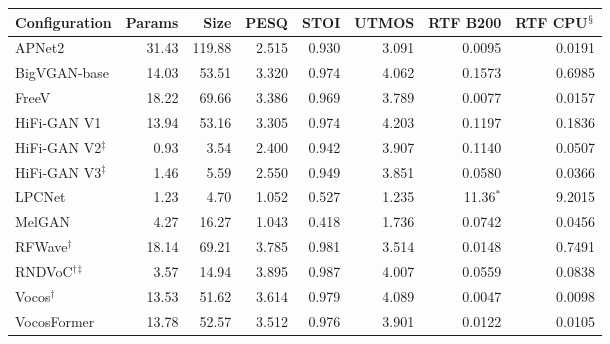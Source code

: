 \begin{tabular*}{\linewidth}{@{\extracolsep{\fill}}lrrrrrrr@{}}
  \toprule
  Configuration & Params & Size & PESQ & STOI & UTMOS & RTF B200 & RTF CPU$^{\mathsection}$ \\
  \midrule
  APNet2 & 31.43 & 119.88 & 2.515 & 0.930 & 3.091 & 0.0095 & 0.0191 \\
  BigVGAN-base & 14.03 & 53.51 & 3.320 & 0.974 & 4.062 & 0.1573 & 0.6985 \\
  FreeV & 18.22 & 69.66 & 3.386 & 0.969 & 3.789 & 0.0077 & 0.0157 \\
  HiFi-GAN V1 & 13.94 & 53.16 & 3.305 & 0.974 & 4.203 & 0.1197 & 0.1836 \\
  HiFi-GAN V2$^{\ddagger}$ & 0.93 & 3.54 & 2.400 & 0.942 & 3.907 & 0.1140 & 0.0507 \\
  HiFi-GAN V3$^{\ddagger}$ & 1.46 & 5.59 & 2.550 & 0.949 & 3.851 & 0.0580 & 0.0366 \\
  LPCNet & 1.23 & 4.70 & 1.052 & 0.527 & 1.235 & 11.36$^{*}$ & 9.2015 \\
  MelGAN & 4.27 & 16.27 & 1.043 & 0.418 & 1.736 & 0.0742 & 0.0456 \\
  RFWave$^{\dagger}$ & 18.14 & 69.21 & 3.785 & 0.981 & 3.514 & 0.0148 & 0.7491 \\
  RNDVoC$^{\dagger}$$^{\ddagger}$ & 3.57 & 14.94 & 3.895 & 0.987 & 4.007 & 0.0559 & 0.0838 \\
  Vocos$^{\dagger}$ & 13.53 & 51.62 & 3.614 & 0.979 & 4.089 & 0.0047 & 0.0098 \\
  VocosFormer & 13.78 & 52.57 & 3.512 & 0.976 & 3.901 & 0.0122 & 0.0105 \\
  \bottomrule
\end{tabular*}
